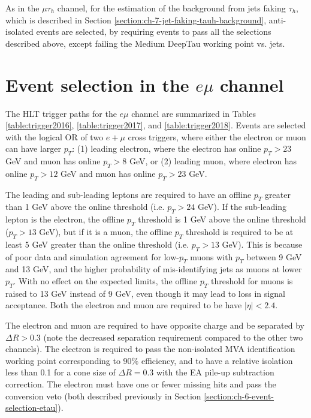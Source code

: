 As in the $\mu\tau_{h}$ channel, for the estimation of the background from jets faking $\tau_{h}$, which is described in Section \ref{section:ch-7-jet-faking-tauh-background}, anti-isolated events are selected, by requiring events to pass all the selections described above, except failing the Medium DeepTau working point vs. jets.

\section{Event selection in the \texorpdfstring{$e\mu$}{emu} channel}
\label{section:ch-6-event-selection-emu}

The HLT trigger paths for the $e\mu$ channel are summarized in Tables \ref{table:trigger2016}, \ref{table:trigger2017}, and \ref{table:trigger2018}. Events are selected with the logical OR of two $e+\mu$ cross triggers, where either the electron or muon can have larger $p_{T}$: (1) leading electron, where the electron has online $p_{T} > 23$ GeV and muon has online $p_{T} > 8$ GeV, or (2) leading muon, where electron has online $p_{T} > 12$ GeV and muon has online $p_{T}>23$ GeV.

The leading and sub-leading leptons are required to have an offline $p_{T}$ greater than 1 GeV above the online threshold (i.e. $p_{T} > 24$ GeV). If the sub-leading lepton is the electron, the offline $p_{T}$ threshold is 1 GeV above the online threshold ($p_{T} > 13$ GeV), but if it is a muon, the offline $p_{T}$ threshold is required to be at least 5 GeV greater than the online threshold (i.e. $p_T > 13$ GeV). This is because of poor data and simulation agreement for low-$p_T$ muons with $p_T$ between 9 GeV and 13 GeV, and the higher probability of mis-identifying jets as muons at lower $p_{T}$. With no effect on the expected limits, the offline $p_{T}$ threshold for muons is raised to 13 GeV instead of 9 GeV, even though it may lead to loss in signal acceptance. Both the electron and muon are required to be have $|\eta| < 2.4$.

The electron and muon are required to have opposite charge and be separated by $\Delta R > 0.3$ (note the decreased separation requirement compared to the other two channels). The electron is required to pass the non-isolated MVA identification working point corresponding to 90\% efficiency, and to have a relative isolation less than 0.1 for a cone size of $\Delta R = 0.3$ with the EA pile-up subtraction correction. The electron must have one or fewer missing hits and pass the conversion veto (both described previously in Section \ref{section:ch-6-event-selection-etau}). 

